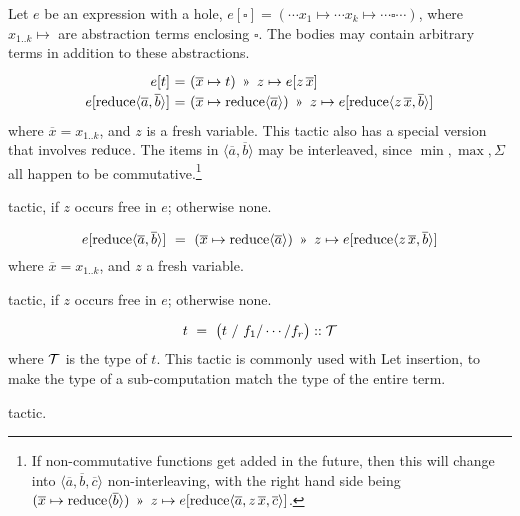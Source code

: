 Let $e$ be an expression with a hole, $e[\square] = (\cdots x_1 \mapsto \cdots x_k\mapsto \cdots \square \cdots)$, 
where $x_{1..k}\mapsto$ are abstraction terms enclosing $\square$. The bodies may contain arbitrary terms
in addition to these abstractions.
%
\[\renewcommand\arraystretch{1.2}
  \begin{array}{@{}r@{}c@{}l@{}}
  e[t] & ~=~ & (\overline{x}\mapsto t) ~\applt~ z\mapsto e[z\,\overline{x}] \\
  e[\reduce \langle\overline{a},\overline{b}\rangle] & ~=~ &
     (\overline{x}\mapsto \reduce\langle\overline{a}\rangle) ~\applt~ z\mapsto e[\reduce\langle z\,\overline{x}, \overline{b}\rangle]
  \end{array}\]
%
where $\overline{x}=x_{1..k}$, and $z$ is a fresh variable.
This tactic also has a special version that involves $\operatorname{reduce}$.
The items in $\langle \overline{a},\overline{b}\rangle$ may be interleaved, since
$\min,\max,\Sigma$ all happen to be commutative.\footnote{If non-commutative functions get added in the future, then this will change into $\langle \overline{a}, \overline{b}, \overline{c}\rangle$ non-interleaving, with the right hand side being $(\overline{x}\mapsto \reduce\langle\overline{b}\rangle) ~\applt~ z\mapsto e[\reduce\langle \overline{a}, z\,\overline{x}, \overline{c}\rangle]$.}

\Obligations tactic, if $z$ occurs free in $e$; otherwise none.

%
\[e[\reduce \langle\overline{a},\overline{b}\rangle] ~=~ 
  (\overline{x}\mapsto \reduce\langle\overline{a}\rangle) ~\applt~ z\mapsto e[\reduce\langle z\,\overline{x}, \overline{b}\rangle]\]
%
where $\overline{x}=x_{1..k}$, and $z$ a fresh variable.

\Obligations tactic, if $z$ occurs free in $e$; otherwise none.

\[t ~=~ \big(t~/~f_1/\cdots/f_r\big) :: \mathcal{T}\]
%
where $\mathcal{T}$ is the type of $t$. This tactic is commonly used with Let insertion,
to make the type of a sub-computation match the type of the entire term.

\Obligations tactic.


